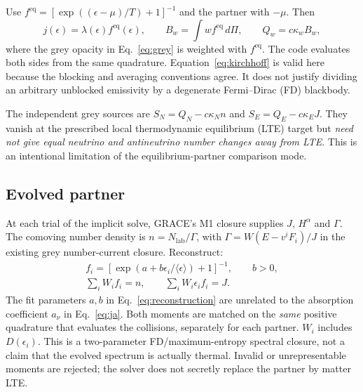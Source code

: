 \documentclass[11pt,a4paper]{article}
\newcommand{\eq}{\mathrm{eq}}
\begin{document}
Use $f^\eq=[\exp((\epsilon-\mu)/T)+1]^{-1}$ and the partner with $-\mu$.
Then
\begin{equation}\label{eq:kirchhoff}
 j(\epsilon)=\lambda(\epsilon)f^\eq(\epsilon),\qquad
 B_w=\int wf^\eq\,d\Pi,\qquad Q_w=c\kappa_w B_w,
\end{equation}
where the grey opacity in Eq.~\eqref{eq:grey} is weighted with $f^\eq$.
The code evaluates both sides from the same quadrature.
Equation~\eqref{eq:kirchhoff} is valid here because the blocking and averaging
conventions agree. It does not justify dividing an arbitrary unblocked
emissivity by a degenerate Fermi--Dirac (FD) blackbody.

The independent grey sources are $S_N=Q_N-c\kappa_N n$ and
$S_E=Q_E-c\kappa_E J$. They vanish at the prescribed local thermodynamic
equilibrium (LTE) target but \emph{need not give equal neutrino and
antineutrino number changes away from LTE}. This is an intentional limitation
of the equilibrium-partner comparison mode.

\subsection{Evolved partner}

At each trial of the implicit solve, GRACE's M1 closure supplies $J$,
$H^\alpha$ and $\Gamma$. The comoving number density is
$n=N_{\mathrm{lab}}/\Gamma$, with
$\Gamma=W(E-v^iF_i)/J$ in the existing grey number-current closure.
Reconstruct:
\begin{equation}\label{eq:reconstruction}
 \begin{gathered}
 f_i=[\exp(a+b\epsilon_i/\langle\epsilon\rangle)+1]^{-1},\qquad b>0,\\
 \sum_i W_i f_i=n,\qquad \sum_i W_i\epsilon_i f_i=J.
 \end{gathered}
\end{equation}
The fit parameters $a,b$ in Eq.~\eqref{eq:reconstruction} are unrelated to
the absorption coefficient $a_\nu$ in Eq.~\eqref{eq:ja}.
Both moments are matched on the \emph{same} positive quadrature that
evaluates the collisions, separately for each partner. $W_i$ includes
$D(\epsilon_i)$. This is a two-parameter FD/maximum-entropy spectral closure,
not a claim that the evolved spectrum is actually thermal. Invalid or
unrepresentable moments are rejected; the solver does not secretly replace
the partner by matter LTE.
\end{document}
